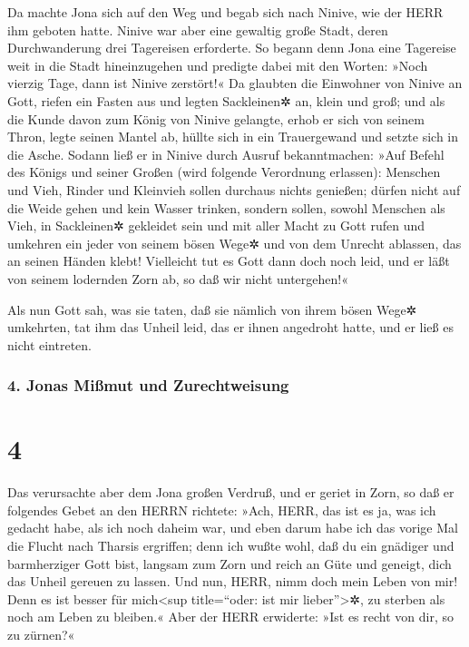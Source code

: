 Da machte Jona sich auf den Weg und begab sich nach
Ninive, wie der HERR ihm geboten hatte. Ninive war aber eine gewaltig
große Stadt, deren Durchwanderung drei Tagereisen erforderte.
So begann denn Jona eine Tagereise weit in die Stadt
hineinzugehen und predigte dabei mit den Worten: »Noch vierzig Tage,
dann ist Ninive zerstört!« Da glaubten die Einwohner von
Ninive an Gott, riefen ein Fasten aus und legten Sackleinen✲ an, klein
und groß; und als die Kunde davon zum König von Ninive
gelangte, erhob er sich von seinem Thron, legte seinen Mantel ab, hüllte
sich in ein Trauergewand und setzte sich in die Asche.
Sodann ließ er in Ninive durch Ausruf bekanntmachen: »Auf
Befehl des Königs und seiner Großen (wird folgende Verordnung erlassen):
Menschen und Vieh, Rinder und Kleinvieh sollen durchaus nichts genießen;
dürfen nicht auf die Weide gehen und kein Wasser trinken,
sondern sollen, sowohl Menschen als Vieh, in Sackleinen✲
gekleidet sein und mit aller Macht zu Gott rufen und umkehren ein jeder
von seinem bösen Wege✲ und von dem Unrecht ablassen, das an seinen
Händen klebt! Vielleicht tut es Gott dann doch noch leid,
und er läßt von seinem lodernden Zorn ab, so daß wir nicht untergehen!«

Als nun Gott sah, was sie taten, daß sie nämlich von
ihrem bösen Wege✲ umkehrten, tat ihm das Unheil leid, das er ihnen
angedroht hatte, und er ließ es nicht eintreten.

\hypertarget{jonas-miuxdfmut-und-zurechtweisung}{%
\subsubsection{4. Jonas Mißmut und
Zurechtweisung}\label{jonas-miuxdfmut-und-zurechtweisung}}

\hypertarget{section-3}{%
\section{4}\label{section-3}}

Das verursachte aber dem Jona großen Verdruß, und er
geriet in Zorn, so daß er folgendes Gebet an den HERRN
richtete: »Ach, HERR, das ist es ja, was ich gedacht habe, als ich noch
daheim war, und eben darum habe ich das vorige Mal die Flucht nach
Tharsis ergriffen; denn ich wußte wohl, daß du ein gnädiger und
barmherziger Gott bist, langsam zum Zorn und reich an Güte und geneigt,
dich das Unheil gereuen zu lassen. Und nun, HERR, nimm
doch mein Leben von mir! Denn es ist besser für mich\textless sup
title=``oder: ist mir lieber''\textgreater✲, zu sterben als noch am
Leben zu bleiben.« Aber der HERR erwiderte: »Ist es recht
von dir, so zu zürnen?«

